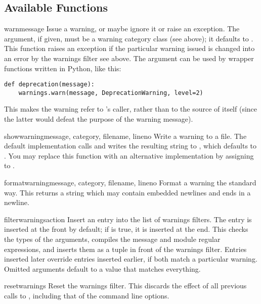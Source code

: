 \subsection{Available Functions \label{warning-functions}}

\begin{funcdesc}{warn}{message}
Issue a warning, or maybe ignore it or raise an exception.  The
 argument, if given, must be a warning category class
(see above); it defaults to .  This function
raises an exception if the particular warning issued is changed
into an error by the warnings filter see above.  The 
argument can be used by wrapper functions written in Python, like
this:

\begin{verbatim}
def deprecation(message):
    warnings.warn(message, DeprecationWarning, level=2)
\end{verbatim}

This makes the warning refer to 's caller,
rather than to the source of  itself (since
the latter would defeat the purpose of the warning message).
\end{funcdesc}

\begin{funcdesc}{showwarning}{message, category, filename,
			     lineno}
Write a warning to a file.  The default implementation calls
 and writes the resulting string to , which
defaults to .  You may replace this function with an
alternative implementation by assigning to
.
\end{funcdesc}

\begin{funcdesc}{formatwarning}{message, category, filename, lineno}
Format a warning the standard way.  This returns a string  which may
contain embedded newlines and ends in a newline.
\end{funcdesc}

\begin{funcdesc}{filterwarnings}{action}
Insert an entry into the list of warnings filters.  The entry is
inserted at the front by default; if  is true, it is
inserted at the end.
This checks the types of the arguments, compiles the message and
module regular expressions, and inserts them as a tuple in front
of the warnings filter.  Entries inserted later override entries
inserted earlier, if both match a particular warning.  Omitted
arguments default to a value that matches everything.
\end{funcdesc}

\begin{funcdesc}{resetwarnings}{}
Reset the warnings filter.  This discards the effect of all previous
calls to , including that of the
 command line options.
\end{funcdesc}
